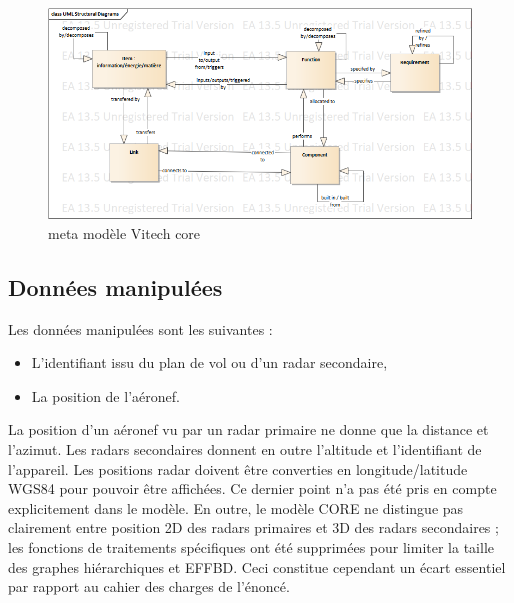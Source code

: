 \begin{figure}[H]
	\begin{center}	
\includegraphics[scale=0.50]{images/meta_modele}
\caption{meta modèle Vitech core}
\label{meta}
	\end{center}
\end{figure}


\subsection{ Données manipulées }

Les données manipulées sont les suivantes :
\begin{itemize}
	\item L'identifiant issu du plan de vol ou d'un radar secondaire,
	\item La position de l'aéronef.
\end{itemize}

La position d'un aéronef vu par un radar primaire ne donne que la distance et l'azimut. Les radars secondaires donnent en outre l'altitude et l'identifiant de l'appareil. Les positions radar doivent être converties en longitude/latitude WGS84 pour pouvoir être affichées. Ce dernier point n'a pas été pris en compte explicitement dans le modèle. En outre, le modèle CORE
ne distingue pas clairement entre position 2D des radars primaires et 3D des radars secondaires ; les fonctions de traitements spécifiques ont été supprimées pour limiter la taille des  graphes hiérarchiques et EFFBD. Ceci constitue cependant un écart essentiel par rapport au cahier des charges de l'énoncé.
